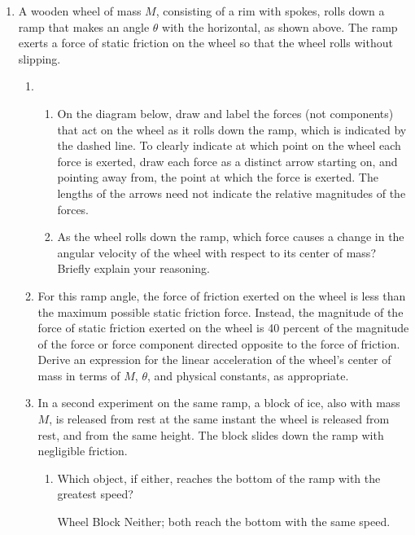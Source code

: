 \documentclass{../../../oss-classkick}
\begin{document}
\begin{enumerate}
\item A wooden wheel of mass $M$, consisting of a rim with spokes, rolls down
  a ramp that makes an angle $\theta$ with the horizontal, as shown above. The
  ramp exerts a force of static friction on the wheel so that the wheel rolls
  without slipping.
  \begin{enumerate}
  \item
    \begin{enumerate}
    \item On the diagram below, draw and label the forces (not components) that
      act on the wheel as it rolls down the ramp, which is indicated by the
      dashed line. To clearly indicate at which point on the wheel each force
      is exerted, draw each force as a distinct arrow starting on, and pointing
      away from, the point at which the force is exerted. The lengths of the
      arrows need not indicate the relative magnitudes of the forces.
    \item As the wheel rolls down the ramp, which force causes a change in the
      angular velocity of the wheel with respect to its center of mass? Briefly
      explain your reasoning.
    \end{enumerate}

  \item For this ramp angle, the force of friction exerted on the wheel is less
    than the maximum possible static friction force. Instead, the magnitude of
    the force of static friction exerted on the wheel is 40 percent of the
    magnitude of the force or force component directed opposite to the force of
    friction. Derive an expression for the linear acceleration of the wheel's
    center of mass in terms of $M$, $\theta$, and physical constants, as
    appropriate.
    
  \item In a second experiment on the same ramp, a block of ice, also with mass
    $M$, is released from rest at the same instant the wheel is released from
    rest, and from the same height. The block slides down the ramp with
    negligible friction.
    \begin{enumerate}
    \item Which object, if either, reaches the bottom of the ramp with the
      greatest speed?

      \vspace{.1in}
      \underline{\hspace{.3in}} Wheel\hspace{.2in}
      \underline{\hspace{.3in}} Block\hspace{.2in}
      \underline{\hspace{.3in}} Neither; both reach the bottom with the same
      speed.


\end{enumerate}
\end{enumerate}
\end{enumerate}
\end{document}

